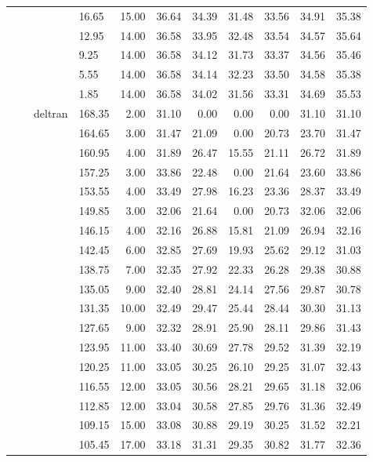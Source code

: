 \begin{longtable}{llllrrrrrrr}
   &  &  & 16.65 & 15.00 & 36.64 & 34.39 & 31.48 & 33.56 & 34.91 & 35.38 \\ 
   &  &  & 12.95 & 14.00 & 36.58 & 33.95 & 32.48 & 33.54 & 34.57 & 35.64 \\ 
   &  &  & 9.25 & 14.00 & 36.58 & 34.12 & 31.73 & 33.37 & 34.56 & 35.46 \\ 
   &  &  & 5.55 & 14.00 & 36.58 & 34.14 & 32.23 & 33.50 & 34.58 & 35.38 \\ 
   &  &  & 1.85 & 14.00 & 36.58 & 34.02 & 31.56 & 33.31 & 34.69 & 35.53 \\ 
   &  & deltran & 168.35 & 2.00 & 31.10 & 0.00 & 0.00 & 0.00 & 31.10 & 31.10 \\ 
   &  &  & 164.65 & 3.00 & 31.47 & 21.09 & 0.00 & 20.73 & 23.70 & 31.47 \\ 
   &  &  & 160.95 & 4.00 & 31.89 & 26.47 & 15.55 & 21.11 & 26.72 & 31.89 \\ 
   &  &  & 157.25 & 3.00 & 33.86 & 22.48 & 0.00 & 21.64 & 23.60 & 33.86 \\ 
   &  &  & 153.55 & 4.00 & 33.49 & 27.98 & 16.23 & 23.36 & 28.37 & 33.49 \\ 
   &  &  & 149.85 & 3.00 & 32.06 & 21.64 & 0.00 & 20.73 & 32.06 & 32.06 \\ 
   &  &  & 146.15 & 4.00 & 32.16 & 26.88 & 15.81 & 21.09 & 26.94 & 32.16 \\ 
   &  &  & 142.45 & 6.00 & 32.85 & 27.69 & 19.93 & 25.62 & 29.12 & 31.03 \\ 
   &  &  & 138.75 & 7.00 & 32.35 & 27.92 & 22.33 & 26.28 & 29.38 & 30.88 \\ 
   &  &  & 135.05 & 9.00 & 32.40 & 28.81 & 24.14 & 27.56 & 29.87 & 30.78 \\ 
   &  &  & 131.35 & 10.00 & 32.49 & 29.47 & 25.44 & 28.44 & 30.30 & 31.13 \\ 
   &  &  & 127.65 & 9.00 & 32.32 & 28.91 & 25.90 & 28.11 & 29.86 & 31.43 \\ 
   &  &  & 123.95 & 11.00 & 33.40 & 30.69 & 27.78 & 29.52 & 31.39 & 32.19 \\ 
   &  &  & 120.25 & 11.00 & 33.05 & 30.25 & 26.10 & 29.25 & 31.07 & 32.43 \\ 
   &  &  & 116.55 & 12.00 & 33.05 & 30.56 & 28.21 & 29.65 & 31.18 & 32.06 \\ 
   &  &  & 112.85 & 12.00 & 33.04 & 30.58 & 27.85 & 29.76 & 31.36 & 32.49 \\ 
   &  &  & 109.15 & 15.00 & 33.08 & 30.88 & 29.19 & 30.25 & 31.52 & 32.21 \\ 
   &  &  & 105.45 & 17.00 & 33.18 & 31.31 & 29.35 & 30.82 & 31.77 & 32.36 \\ 

\end{longtable}

